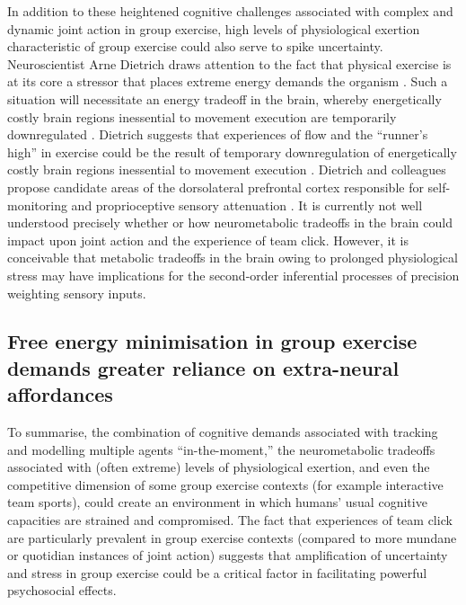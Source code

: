 \begin{CJK}{UTF8}{gbsn}
In addition to these heightened cognitive challenges associated with complex and dynamic joint action in group exercise, high levels of physiological exertion characteristic of group exercise could also serve to spike uncertainty.  Neuroscientist Arne Dietrich draws attention to the fact that physical exercise is at its core a stressor that places extreme energy demands the organism \citep{Dietrich2011}.
Such a situation will necessitate an energy tradeoff in the brain, whereby energetically costly brain regions inessential to movement execution are temporarily downregulated \citep{Dietrich2004b}.  Dietrich suggests that experiences of flow and the ``runner's high'' in exercise could be the result of temporary downregulation of energetically costly brain regions inessential to movement execution  \citep{Dietrich2004b}.  Dietrich and colleagues propose candidate areas of the dorsolateral prefrontal cortex responsible for self-monitoring and proprioceptive sensory attenuation \citep[commonly known as the ``inner critic'' regions of the brain, see][]{Limb2008}.  It is currently not well understood precisely whether or how neurometabolic tradeoffs in the brain could impact upon joint action and the experience of team click.  However, it is conceivable that metabolic tradeoffs in the brain owing to prolonged physiological stress may have implications for the second-order inferential processes of precision weighting sensory inputs.


\subsection{Free energy minimisation in group exercise demands greater reliance on extra-neural affordances \label{sect:extraNeural}}
To summarise, the combination of cognitive demands associated with tracking and modelling multiple agents ``in-the-moment,'' the neurometabolic tradeoffs associated with (often extreme) levels of physiological exertion, and even the competitive dimension of some group exercise contexts (for example interactive team sports), could create an environment in which humans' usual cognitive capacities are strained and compromised.  The fact that experiences of team click are particularly prevalent in group exercise contexts (compared to more mundane or quotidian instances of joint action) suggests that amplification of uncertainty and stress in group exercise could be a critical factor in facilitating powerful psychosocial effects.


\end{CJK}

